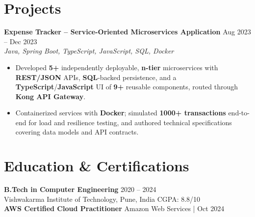 \documentclass[a4paper,10pt]{article}
\begin{document}
\section*{Projects}

\textbf{Expense Tracker -- Service-Oriented Microservices Application} \hfill Aug 2023 -- Dec 2023 \\
\textit{Java, Spring Boot, TypeScript, JavaScript, SQL, Docker}
\begin{itemize}[leftmargin=*]
    \item Developed \textbf{5+} independently deployable, \textbf{n-tier} microservices with \textbf{REST/JSON} APIs, \textbf{SQL}-backed persistence, and a \textbf{TypeScript}/\textbf{JavaScript} UI of \textbf{9+} reusable components, routed through \textbf{Kong API Gateway}.
    \item Containerized services with \textbf{Docker}; simulated \textbf{1000+ transactions} end-to-end for load and resilience testing, and authored technical specifications covering data models and API contracts.
\end{itemize}

\section*{Education \& Certifications}
\textbf{B.Tech in Computer Engineering} \hfill 2020 -- 2024 \\
Vishwakarma Institute of Technology, Pune, India \hfill CGPA: 8.8/10 \\
\textbf{AWS Certified Cloud Practitioner} \hfill Amazon Web Services \;|\; Oct 2024
\end{document}
